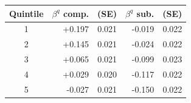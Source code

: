 \begin{tabular}{@{}crrrr@{}}
\toprule
Quintile & {$\beta^q$ comp.} & {(SE)} & {$\beta^q$ sub.} & {(SE)} \\
\midrule
1 & +0.197 & 0.021 & -0.019 & 0.022 \\
2 & +0.145 & 0.021 & -0.024 & 0.022 \\
3 & +0.065 & 0.021 & -0.099 & 0.023 \\
4 & +0.029 & 0.020 & -0.117 & 0.022 \\
5 & -0.027 & 0.021 & -0.150 & 0.022 \\
\bottomrule
\end{tabular}
